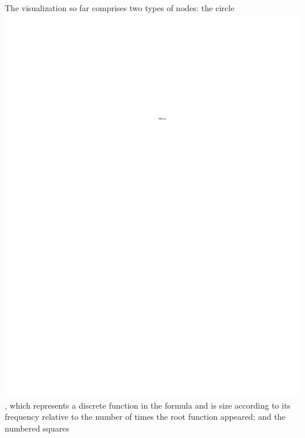 \documentclass[conference]{IEEEtran}
\begin{document}
	The visualization so far comprises two types of nodes: the circle
	\includegraphics{glossary-greenonly}, which represents a discrete function in
	the formula and is size according to its frequency relative to the number of
	times the root function appeared; and the numbered squares
\end{document}
